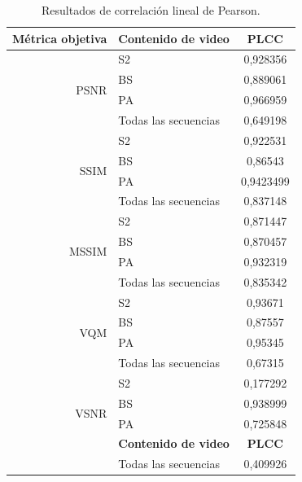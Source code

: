 \documentclass[conference]{IEEEtran}
\begin{document}
    \begin{table}
        \begin{center}
            \begin{tabular}{| r | l | c |}
                \hline
                \textbf{Métrica objetiva} & \textbf{Contenido de video} & \textbf{PLCC} \\ \hline
                \multirow{4}{1.5cm}{PSNR} & S2 & 0,928356 \\ \cline{2-3}
                    & BS & 0,889061 \\ \cline{2-3} 
                    & PA & 0,966959 \\ \cline{2-3} 
                    & Todas las secuencias & 0,649198 \\ \hline
                \multirow{4}{1.5cm}{SSIM} & S2 & 0,922531 \\ \cline{2-3}
                    & BS & 0,86543 \\ \cline{2-3} 
                    & PA & 0,9423499 \\ \cline{2-3} 
                    & Todas las secuencias & 0,837148 \\ \hline
                \multirow{4}{1.5cm}{MSSIM} & S2 & 0,871447 \\ \cline{2-3}
                    & BS & 0,870457 \\ \cline{2-3} 
                    & PA & 0,932319 \\ \cline{2-3} 
                    & Todas las secuencias & 0,835342 \\ \hline
                \multirow{4}{1.5cm}{VQM} & S2 & 0,93671 \\ \cline{2-3}
                    & BS & 0,87557 \\ \cline{2-3} 
                    & PA & 0,95345 \\ \cline{2-3} 
                    & Todas las secuencias & 0,67315 \\ \hline
                \multirow{4}{1.5cm}{VSNR} & S2 & 0,177292 \\ \cline{2-3}
                    & BS & 0,938999 \\ \cline{2-3} 
                    & PA & 0,725848 \\ \hline
                \textbf{Métrica objetiva} & \textbf{Contenido de video} & \textbf{PLCC} \\ \hline
                    & Todas las secuencias & 0,409926 \\ \hline
            \end{tabular}
            \caption{Resultados de correlación lineal de Pearson.}
            \label{Tabla1}
        \end{center}
    \end{table}
\end{document}
